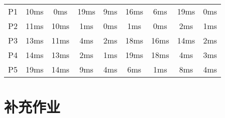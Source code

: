 \documentclass{ctexart}
\begin{document}
\begin{outline}[enumerate]
\begin{table}[H]
\begin{tabular}{*{9}{c}}
          \midrule
          P1 & 10ms & 0ms & 19ms & 9ms & 16ms & 6ms & 19ms & 0ms \\
          P2 & 11ms & 10ms & 1ms & 0ms & 1ms & 0ms & 2ms & 1ms \\
          P3 & 13ms & 11ms & 4ms & 2ms & 18ms & 16ms & 14ms & 2ms \\
          P4 & 14ms & 13ms & 2ms & 1ms & 19ms & 18ms & 4ms & 3ms \\
          P5 & 19ms & 14ms & 9ms & 4ms & 6ms & 1ms & 8ms & 4ms \\
          \bottomrule
        \end{tabular}
      \end{table}
\end{outline}

\section*{补充作业}
\end{document}
